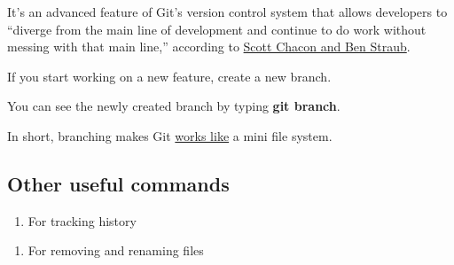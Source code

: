 \documentclass[
  letterpaper,
  DIV=11,
  numbers=noendperiod]{scrreprt}
\newenvironment{Shaded}{\begin{snugshade}}{\end{snugshade}}
\newcommand{\AttributeTok}[1]{\textcolor[rgb]{0.40,0.45,0.13}{#1}}
\newcommand{\CommentTok}[1]{\textcolor[rgb]{0.37,0.37,0.37}{#1}}
\newcommand{\ExtensionTok}[1]{\textcolor[rgb]{0.00,0.23,0.31}{#1}}
\newcommand{\NormalTok}[1]{\textcolor[rgb]{0.00,0.23,0.31}{#1}}
\newcommand{\OperatorTok}[1]{\textcolor[rgb]{0.37,0.37,0.37}{#1}}
\providecommand{\tightlist}{%
  \setlength{\itemsep}{0pt}\setlength{\parskip}{0pt}}\usepackage{longtable,booktabs,array}
\begin{document}
It's an advanced feature of Git's version control system that allows
developers to ``diverge from the main line of development and continue
to do work without messing with that main line,'' according to
\href{https://git-scm.com/book/en/v1/Git-Branching}{Scott Chacon and Ben
Straub}.

If you start working on a new feature, create a new branch.

\begin{Shaded}
\end{Shaded}

You can see the newly created branch by typing \textbf{git branch}.

In short, branching makes Git
\href{https://git-scm.com/book/en/v2/Getting-Started-Git-Basics}{works
like} a mini file system.

\hypertarget{other-useful-commands}{%
\subsection*{Other useful commands}\label{other-useful-commands}}

\begin{enumerate}
\def\labelenumi{\arabic{enumi}.}
\tightlist
\item
  For tracking history
\end{enumerate}

\begin{Shaded}
\end{Shaded}

\begin{enumerate}
\def\labelenumi{\arabic{enumi}.}
\setcounter{enumi}{1}
\tightlist
\item
  For removing and renaming files
\end{enumerate}
\end{document}
